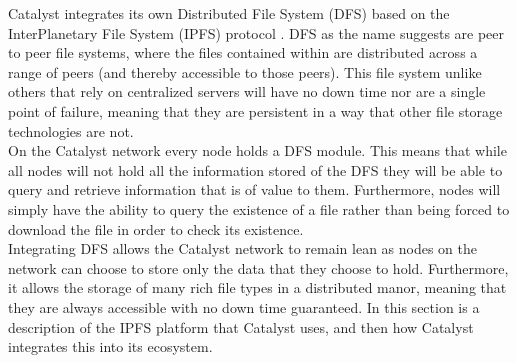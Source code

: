 Catalyst integrates its own Distributed File System (DFS) \cite{DFS} based on the InterPlanetary File System (IPFS) protocol \cite{benet2014ipfs}. DFS as the name suggests are peer to peer file systems, where the files contained within are distributed across a range of peers (and thereby accessible to those peers). This file system unlike others that rely on centralized servers will have no down time nor are a single point of failure, meaning that they are persistent in a way that other file storage technologies are not. \\



On the Catalyst network every node holds a DFS module. This means that while all nodes will not hold all the information stored of the DFS they will be able to query and retrieve information that is of value to them. Furthermore, nodes will simply have the ability to query the existence of a file rather than being forced to download the file in order to check
its existence. \\                                                                                                                                                                                                                                                                                                                                                                                                                                                                                                                                                                                                                                                                                                                                                                                                                                                                                                                                                                                                                                                                                                                                                       

Integrating DFS allows the Catalyst network to remain lean as nodes on the network can choose to store only the data that they choose to hold. Furthermore, it allows the storage of many rich file types in a distributed manor, meaning that they are always accessible with no down time guaranteed. In this section is a description of the IPFS platform that Catalyst uses, and then how Catalyst integrates this into its ecosystem. 